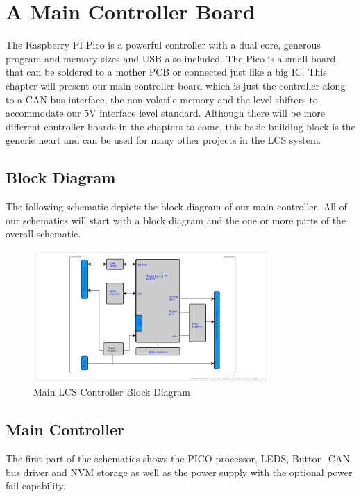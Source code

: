\chapter{A Main Controller Board}

The Raspberry PI Pico is a powerful controller with a dual core, generous program and memory sizes and USB also included. The Pico is a small board that can be soldered to a mother PCB or connected just like a big IC. This chapter will present our main controller board which is just the controller along to a CAN bus interface, the non-volatile memory and the level shifters to accommodate our 5V interface level standard. Although there will be more different controller boards in the chapters to come, this basic building block is the generic heart and can be used for many other projects in the LCS system.

\section{Block Diagram}

The following schematic depicts the block diagram of our main controller. All of our schematics will start with a block diagram and the one or more parts of the overall schematic.

\begin{figure}[htbp]
    \centering
    \includegraphics[page=1, width=0.8\textwidth]{./Schematics/Schematic_LcsNodes-Main-Controller-Board.pdf}
    \caption{Main LCS Controller Block Diagram}
\end{figure}
\FloatBarrier

\section{Main Controller}

The first part of the schematics shows the PICO processor, LEDS, Button, CAN bus driver and NVM storage as well as the power supply with the optional power fail capability.

